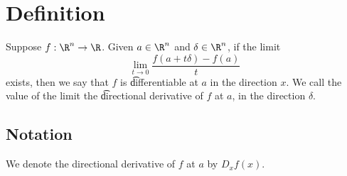 
\section*{Definition}

Suppose $f: \R ^n \to \R $.
Given $a \in \R ^n$ and $\delta  \in \R ^n$, if the limit
\[
\lim_{t \to 0} \frac{f(a + t\delta ) - f(a)}{t}
\]
exists, then we say that $f$ is \t{differentiable at $a$ in the direction $x$}.
We call the value of the limit the \t{directional derivative} of $f$ at $a$, in the direction $\delta $.

\subsection*{Notation}

We denote the directional derivative of $f$ at $a$ by $D_xf(x)$.

\blankpage